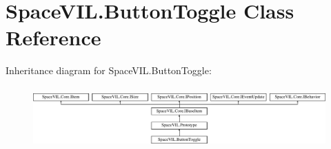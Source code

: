 \hypertarget{class_space_v_i_l_1_1_button_toggle}{}\section{Space\+V\+I\+L.\+Button\+Toggle Class Reference}
\label{class_space_v_i_l_1_1_button_toggle}
Inheritance diagram for Space\+V\+I\+L.\+Button\+Toggle\+:\begin{figure}[H]
\begin{center}
\leavevmode
\includegraphics[height=2.421622cm]{class_space_v_i_l_1_1_button_toggle}
\end{center}
\end{figure}
